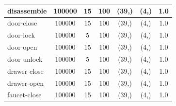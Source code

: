 \documentclass{article}
\theoremstyle{plain}
\theoremstyle{definition}
\theoremstyle{remark}
\begin{document}
\begin{table}[]
{\begin{tabular}{|l|c|c|c|c|c|c|}
disassemble                         & 100000                                        & 15                                                   & 100                                             & (39,)                                           & (4,) & 1.0                                            \\ \hline
door-close                          & 100000                                        & 15                                                   & 100                                             & (39,)                                           & (4,) & 1.0                                            \\ \hline
door-lock                           & 100000                                        & 5                                                    & 100                                             & (39,)                                           & (4,) & 1.0                                            \\ \hline
door-open                           & 100000                                        & 15                                                   & 100                                             & (39,)                                           & (4,) & 1.0                                            \\ \hline
door-unlock                         & 100000                                        & 5                                                    & 100                                             & (39,)                                           & (4,) & 1.0                                            \\ \hline
drawer-close                        & 100000                                        & 15                                                   & 100                                             & (39,)                                           & (4,) & 1.0                                            \\ \hline
drawer-open                         & 100000                                        & 15                                                   & 100                                             & (39,)                                           & (4,) & 1.0                                            \\ \hline
faucet-close                        & 100000                                        & 15                                                   & 100                                             & (39,)                                           & (4,) & 1.0                                            \\ \hline

\end{tabular}}
\end{table}
\end{document}
